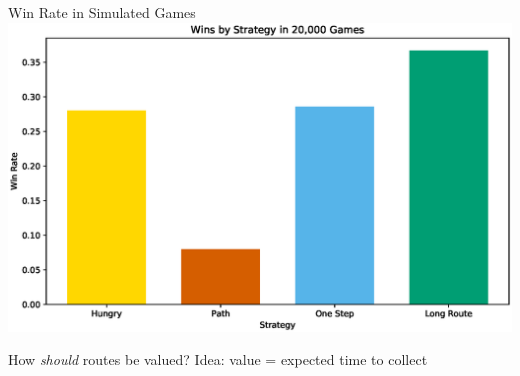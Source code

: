 \documentclass[12pt]{beamer}
\begin{document}
\begin{frame}{Win Rate in Simulated Games}
    \centering
    \includegraphics[scale=.45]{"figures/win_rates"}
\end{frame}

\begin{frame}{How \textit{should} routes be valued?}
   Idea:
   \vspace{1cm}
   value = expected time to collect \footnotemark[3]
\end{frame}
\end{document}
